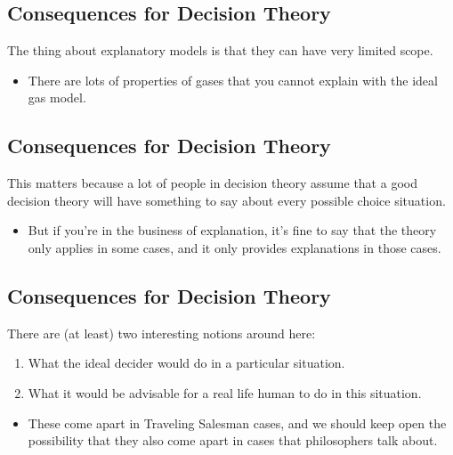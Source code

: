 \documentclass[
  letterpaper,
  DIV=11,
  numbers=noendperiod]{scrartcl}
\providecommand{\tightlist}{%
  \setlength{\itemsep}{0pt}\setlength{\parskip}{0pt}}\usepackage{longtable,booktabs,array}
\begin{document}
\subsection{Consequences for Decision
Theory}\label{consequences-for-decision-theory}

The thing about explanatory models is that they can have very limited
scope.

\begin{itemize}
\tightlist
\item
  There are lots of properties of gases that you cannot explain with the
  ideal gas model.
\end{itemize}

\subsection{Consequences for Decision
Theory}\label{consequences-for-decision-theory-1}

This matters because a lot of people in decision theory assume that a
good decision theory will have something to say about every possible
choice situation.

\begin{itemize}
\tightlist
\item
  But if you're in the business of explanation, it's fine to say that
  the theory only applies in some cases, and it only provides
  explanations in those cases.
\end{itemize}

\subsection{Consequences for Decision
Theory}\label{consequences-for-decision-theory-2}

There are (at least) two interesting notions around here:

\begin{enumerate}
\def\labelenumi{\arabic{enumi}.}
\tightlist
\item
  What the ideal decider would do in a particular situation.
\item
  What it would be advisable for a real life human to do in this
  situation.
\end{enumerate}

\begin{itemize}
\tightlist
\item
  These come apart in Traveling Salesman cases, and we should keep open
  the possibility that they also come apart in cases that philosophers
  talk about.
\end{itemize}
\end{document}
